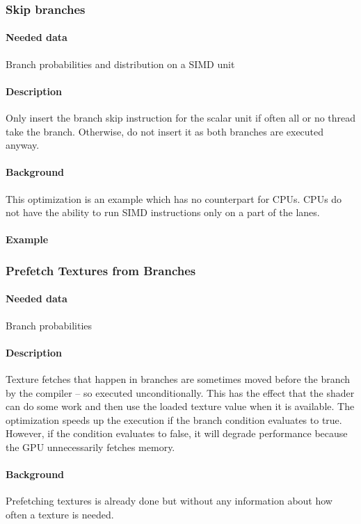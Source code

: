 \subsubsection{Skip branches}
\paragraph{Needed data} Branch probabilities and distribution on a SIMD unit
\paragraph{Description} Only insert the branch skip instruction for the scalar unit if often all or no thread take the branch. Otherwise, do not insert it as both branches are executed anyway.
\paragraph{Background} This optimization is an example which has no counterpart for CPUs. CPUs do not have the ability to run SIMD instructions only on a part of the lanes.
\paragraph{Example}
	
\subsubsection{Prefetch Textures from Branches}
\paragraph{Needed data} Branch probabilities
\paragraph{Description} Texture fetches that happen in branches are sometimes moved before the branch by the compiler -- so executed unconditionally. This has the effect that the shader can do some work and then use the loaded texture value when it is available. The optimization speeds up the execution if the branch condition evaluates to true. However, if the condition evaluates to false, it will degrade performance because the GPU unnecessarily fetches memory.
\paragraph{Background} Prefetching textures is already done but without any information about how often a texture is needed.
